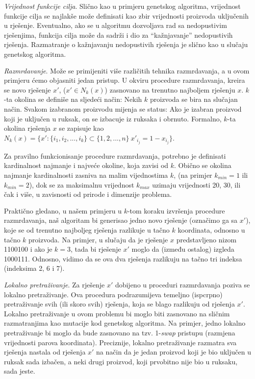 \documentclass[a4paper, utf8, 11pt, colorlinks]{book}
\theoremstyle{definition}
\begin{document}
\emph{Vrijednost funkcije cilja}. Slično kao u primjeru genetskog algoritma, vrijednost funkcije cilja se najlakše može definisati kao zbir vrijednosti proizvoda uključenih u rješenje. Eventualno, ako se u algoritmu dozvoljava rad sa nedopustivim rješenjima, funkcija cilja može da sadrži i dio za ``kažnjavanje'' nedopustivih rješenja. Razmatranje o kažnjavanju nedopustivih rješenja je slično kao u slučaju genetskog algoritma.

\emph{Razmrdavanje}. Može se primijeniti više različitih tehnika razmrdavanja, a u ovom primjeru ćemo objasniti jedan pristup. 
U okviru procedure razmrdavanja, kreira se novo rješenje $x'$, ($x' \in N_k(x)$) zasno\-vano na trenutno najboljem rješenju  $x$.
$k$-ta okolina se definiše na sljedeći način: Nekih $k$ proizvoda se bira na slučajan način. Svakom izabranom proizvodu mijenja se status: Ako je izabran proizvod koji je uključen u ruksak, on se izbacuje iz ruksaka i obrnuto. Formalno, $k$-ta okolina rješenja
$x$ se zapisuje kao  $N_k(x) = \{x':  \{i_1,i_2,...,i_k\}\subset \{1,2,...,n\}\  x'_{i_j}=1-x_{i_j}\}$.

Za pravilno funkcionisanje procedure razmrdavanja, potrebno je definisati kardinalnost najmanje i najveće okoline, koja zavisi od $k$. Obično se okolina najmanje kardinalnosti zasniva na malim vijednostima $k$, (na primjer $k_{min}=1$ ili $k_{min}=2$), dok se za maksimalnu vrijednost $k_{max}$  uzimaju vrijednosti 20, 30, ili čak i više, u zavisnosti od prirode i dimenzije problema.

Praktično gledano, u našem primjeru u $k$-tom koraku izvršenja procedure razmrdavanja, naš algoritam bi generisao jedno novo rješenje (označimo ga sa $x'$), koje se od trenutno najboljeg rješenja razlikuje u tačno $k$ koordinata, odnosno u tačno $k$ proizvoda. Na primjer, u slučaju da je rješenje $x$ predstavljeno nizom 1100100 i ako je $k=3$, tada bi rješenje    $x'$ moglo da  (između ostalog) izgleda
1000111. Odnosno, vidimo da se ova dva rješenja razlikuju na tačno tri indeksa (indeksima 2, 6 i 7).

\emph{Lokalno pretraživanje}. 
Za rješenje  $x'$ dobijeno u  proceduri razmrdavanja poziva se lokalno pretraživanje. Ova procedura podrazumijeva temeljno (ispcrpno) pretraživanje svih (ili skoro svih) rješenja, koja se blago razlikuju od rješenja  $x'$. Lokalno pretraživanje u ovom problemu bi moglo biti zasnovano na sličnim razmatranjima kao mutacije kod genetskog algoritma. Na primjer, jedno lokalno pretraživanje bi moglo da bude zasnovano na tzv. 1-\emph{swap} pristupu (razmjena vrijednosti parova koordinata). Preciznije, lokalno pretraživanje razmatra sva rješenja nastala od rješenja $x'$ na način da je jedan proizvod koji je bio uključen u ruksak sada izbačen, a neki drugi proizvod, koji prvobitno nije bio u ruksaku, sada jeste.
\end{document}
